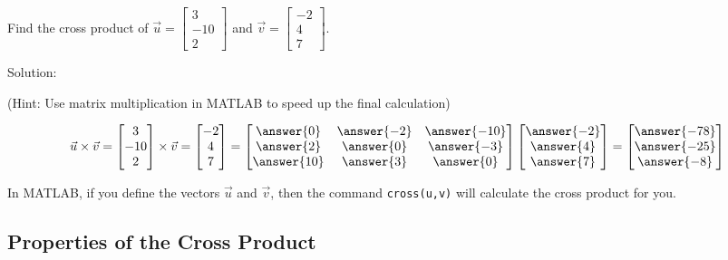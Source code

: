 \documentclass{ximera}
\begin{document}
 
\begin{example}\label{ex:crossproduct}
Find the cross product of $\vec{u}=\begin{bmatrix}3\\ -10\\ 2\end{bmatrix}$ and $\vec{v}=\begin{bmatrix}-2\\ 4\\ 7\end{bmatrix}$.

Solution:

  (Hint: Use matrix multiplication in MATLAB to speed up the final calculation)

$$\vec{u}\times \vec{v}=\begin{bmatrix}3\\ -10\\ 2\end{bmatrix}\times\vec{v}=\begin{bmatrix}-2\\ 4\\ 7\end{bmatrix}=\begin{bmatrix}\answer{0} & \answer{-2} & \answer{-10} \\
\answer{2} & \answer{0} & \answer{-3} \\
\answer{10} & \answer{3} & \answer{0}
\end{bmatrix}
\begin{bmatrix}
\answer{-2} \\ \answer{4} \\ \answer{7}
\end{bmatrix}
=
\begin{bmatrix}
\answer{-78} \\ \answer{-25} \\ \answer{-8}
\end{bmatrix}$$


\end{example}

In MATLAB, if you define the vectors $\vec{u}$ and $\vec{v}$, then the command \texttt{cross(u,v)} will calculate the cross product for you.
 
\subsection*{Properties of the Cross Product}
 
 
\end{document}

